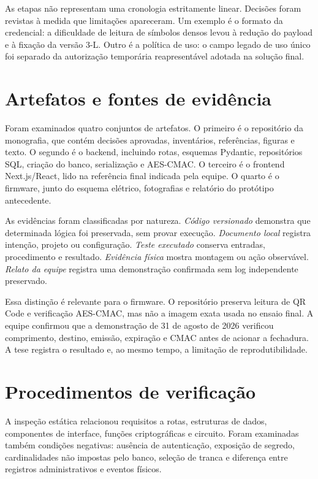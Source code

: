 As etapas não representam uma cronologia estritamente linear. Decisões foram revistas à medida que limitações apareceram. Um exemplo é o formato da credencial: a dificuldade de leitura de símbolos densos levou à redução do payload e à fixação da versão 3-L. Outro é a política de uso: o campo legado de uso único foi separado da autorização temporária reapresentável adotada na solução final.

\section{Artefatos e fontes de evidência}

Foram examinados quatro conjuntos de artefatos. O primeiro é o repositório da monografia, que contém decisões aprovadas, inventários, referências, figuras e texto. O segundo é o backend, incluindo rotas, esquemas Pydantic, repositórios SQL, criação do banco, serialização e AES-CMAC. O terceiro é o frontend Next.js/React, lido na referência final indicada pela equipe. O quarto é o firmware, junto do esquema elétrico, fotografias e relatório do protótipo antecedente.

As evidências foram classificadas por natureza. \textit{Código versionado} demonstra que determinada lógica foi preservada, sem provar execução. \textit{Documento local} registra intenção, projeto ou configuração. \textit{Teste executado} conserva entradas, procedimento e resultado. \textit{Evidência física} mostra montagem ou ação observável. \textit{Relato da equipe} registra uma demonstração confirmada sem log independente preservado.

Essa distinção é relevante para o firmware. O repositório preserva leitura de QR Code e verificação AES-CMAC, mas não a imagem exata usada no ensaio final. A equipe confirmou que a demonstração de 31 de agosto de 2026 verificou comprimento, destino, emissão, expiração e CMAC antes de acionar a fechadura. A tese registra o resultado e, ao mesmo tempo, a limitação de reprodutibilidade.

\section{Procedimentos de verificação}

A inspeção estática relacionou requisitos a rotas, estruturas de dados, componentes de interface, funções criptográficas e circuito. Foram examinadas também condições negativas: ausência de autenticação, exposição de segredo, cardinalidades não impostas pelo banco, seleção de tranca e diferença entre registros administrativos e eventos físicos.

